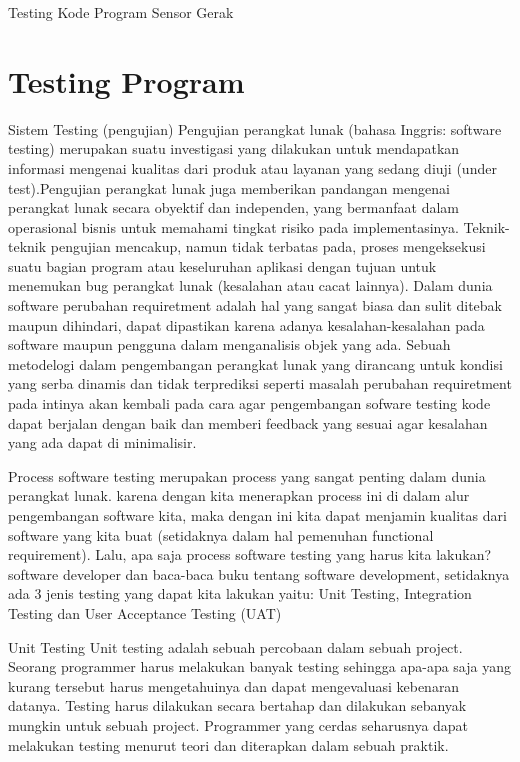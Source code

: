 
Testing Kode Program Sensor Gerak

\section {Testing Program}
Sistem Testing (pengujian)
Pengujian perangkat lunak (bahasa Inggris: software testing) merupakan suatu investigasi yang dilakukan untuk mendapatkan informasi mengenai kualitas dari produk atau layanan yang sedang diuji (under test).Pengujian perangkat lunak juga memberikan pandangan mengenai perangkat lunak secara obyektif dan independen, yang bermanfaat dalam operasional bisnis untuk memahami tingkat risiko pada implementasinya. Teknik-teknik pengujian mencakup, namun tidak terbatas pada, proses mengeksekusi suatu bagian program atau keseluruhan aplikasi dengan tujuan untuk menemukan bug perangkat lunak (kesalahan atau cacat lainnya).
Dalam dunia software perubahan requiretment adalah hal yang sangat biasa dan sulit ditebak maupun dihindari, dapat dipastikan karena adanya kesalahan-kesalahan pada software maupun pengguna dalam menganalisis objek yang ada. Sebuah metodelogi dalam pengembangan perangkat lunak yang dirancang untuk kondisi yang serba dinamis dan tidak terprediksi seperti masalah perubahan requiretment pada intinya akan kembali pada cara agar pengembangan sofware testing kode dapat berjalan dengan baik dan memberi feedback yang sesuai agar kesalahan yang ada dapat di minimalisir.

Process software testing merupakan process yang sangat penting dalam dunia perangkat lunak. karena dengan kita menerapkan process ini di dalam alur pengembangan software kita, maka dengan ini kita dapat menjamin kualitas dari software yang kita buat (setidaknya dalam hal pemenuhan functional requirement). Lalu, apa saja process software testing yang harus kita lakukan? software developer dan baca-baca buku tentang software development, setidaknya ada 3 jenis testing yang dapat kita lakukan yaitu: Unit Testing, Integration Testing dan User Acceptance Testing (UAT)

Unit Testing
Unit testing adalah sebuah percobaan dalam sebuah project. Seorang programmer harus melakukan banyak testing sehingga apa-apa saja yang kurang tersebut harus mengetahuinya dan dapat mengevaluasi kebenaran datanya. Testing harus dilakukan secara bertahap dan dilakukan sebanyak mungkin untuk sebuah project. Programmer yang cerdas seharusnya dapat melakukan testing menurut teori dan diterapkan dalam sebuah praktik.
 
